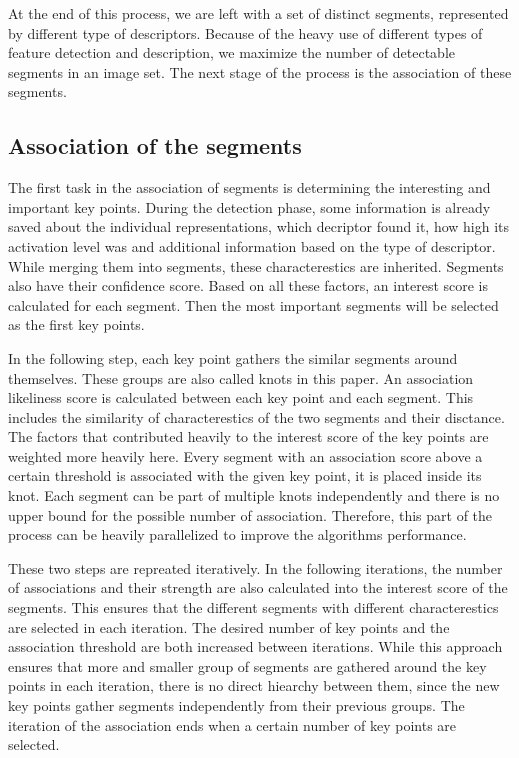 At the end of this process, we are left with a set of distinct segments, represented by different type of descriptors. Because of the heavy use of different types of feature detection and description, we maximize the number of detectable segments in an image set. The next stage of the process is the association of these segments.

\subsection{Association of the segments} %
\label{subsec:assoc_segm}

The first task in the association of segments is determining the interesting and important key points. During the detection phase, some information is already saved about the individual representations, which decriptor found it, how high its activation level was and additional information based on the type of descriptor. While merging them into segments, these characterestics are inherited. Segments also have their confidence score. Based on all these factors, an interest score is calculated for each segment. Then the most important segments will be selected as the first key points.

In the following step, each key point gathers the similar segments around themselves. These groups are also called knots in this paper. An association likeliness score is calculated between each key point and each segment. This includes the similarity of characterestics of the two segments and their disctance. The factors that contributed heavily to the interest score of the key points are weighted more heavily here. Every segment with an association score above a certain threshold is associated with the given key point, it is placed inside its knot. Each segment can be part of multiple knots independently and there is no upper bound for the possible number of association. Therefore, this part of the process can be heavily parallelized to improve the algorithms performance.

These two steps are repreated iteratively. In the following iterations, the number of associations and their strength are also calculated into the interest score of the segments. This ensures that the different segments with different characterestics are selected in each iteration. The desired number of key points and the association threshold are both increased between iterations. While this approach ensures that more and smaller group of segments are gathered around the key points in each iteration, there is no direct hiearchy between them, since the new key points gather segments independently from their previous groups. The iteration of the association ends when a certain number of key points are selected.

